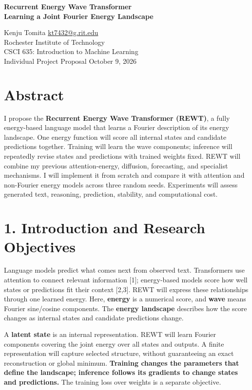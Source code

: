 \documentclass[11pt,letterpaper]{article}
\begin{document}
\begin{center}
{\Large\bfseries Recurrent Energy Wave Transformer\\Learning a Joint Fourier Energy Landscape}\par
\vspace{3pt}
Kenju Tomita \quad \href{mailto:kt7432@g.rit.edu}{kt7432@g.rit.edu}\\
Rochester Institute of Technology\\
CSCI 635: Introduction to Machine Learning\\
Individual Project Proposal \quad October 9, 2026
\end{center}

\section*{Abstract}

I propose the \textbf{Recurrent Energy Wave Transformer (REWT)}, a fully energy-based language model that learns a Fourier description of its energy landscape. One energy function will score all internal states and candidate predictions together. Training will learn the wave components; inference will repeatedly revise states and predictions with trained weights fixed. REWT will combine my previous attention-energy, diffusion, forecasting, and specialist mechanisms. I will implement it from scratch and compare it with attention and non-Fourier energy models across three random seeds. Experiments will assess generated text, reasoning, prediction, stability, and computational cost.

\section*{1. Introduction and Research Objectives}

Language models predict what comes next from observed text. Transformers use attention to connect relevant information [1]; energy-based models score how well states or predictions fit their context [2,3]. REWT will express these relationships through one learned energy. Here, \textbf{energy} is a numerical score, and \textbf{wave} means Fourier sine/cosine components. The \textbf{energy landscape} describes how the score changes as internal states and candidate predictions change.

A \textbf{latent state} is an internal representation. REWT will learn Fourier components covering the joint energy over all states and outputs. A finite representation will capture selected structure, without guaranteeing an exact reconstruction or global minimum. \textbf{Training changes the parameters that define the landscape; inference follows its gradients to change states and predictions.} The training loss over weights is a separate objective.
\end{document}
